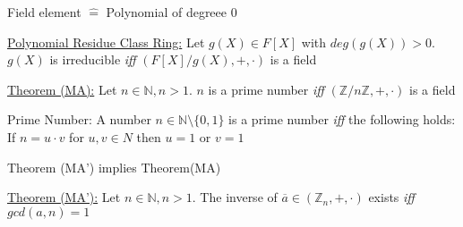 \documentclass[landscape, a4paper]{article}
\begin{document}
\begin{minipage}[t]{0.2\linewidth}
\begin{betterlist}
\begin{betterlist}
\begin{betterlist}
\begin{betterlist}
\begin{betterlist}
						\item Field element $\hat =$ Polynomial of degreee $0$
					\end{betterlist}
				\end{betterlist}
			\end{betterlist}
			\item \underline{Polynomial Residue Class Ring:} Let $g(X)\in F[X]$ with $deg(g(X)) > 0$. $g(X)$ is \alert{irreducible} \textit{iff} $(F[X]/g(X), +, \cdot)$ is a field
		\end{betterlist}
	\end{betterlist}
	\begin{betterlist}
		\item \underline{Theorem (MA):} Let $n \in \mathbb{N}, n > 1$. $n$ is a prime number \textit{iff} $(\mathbb{Z}/n\mathbb{Z}, +, \cdot)$ is a field
		\begin{betterlist}
			\item \alert{Prime Number}: A number $n \in \mathbb{N} \setminus \{0, 1\}$ is a prime number \textit{iff} the following holds: If $n = u \cdot v$ for $u, v \in N$ then $u = 1$ or $v = 1$
			\begin{betterlist}
				\item Theorem (MA') implies Theorem(MA)
			\end{betterlist}
		\end{betterlist}
		\item \underline{Theorem (MA’):} Let $n \in \mathbb{N}, n > 1$. The inverse of $\overline{a} \in (\mathbb{Z}_n, +, \cdot)$ exists \textit{iff} $gcd(a, n) = 1$
		\begin{betterlist}

\end{betterlist}
\end{betterlist}
\end{minipage}
\end{document}
